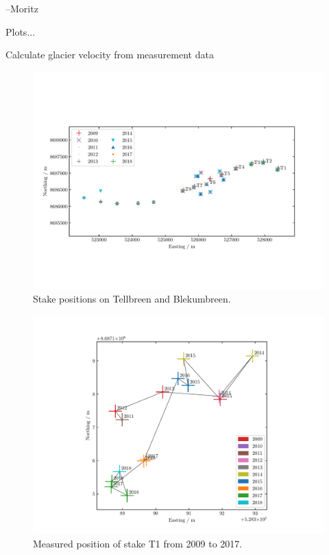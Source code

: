 --Moritz


Plots...

Calculate glacier velocity from measurement data

\begin{figure}[H]
    \centering
    \includegraphics[width=\textwidth]{../fig/stakePositions.pdf}
    \caption{Stake positions on Tellbreen and Blekumbreen.}
    \label{GF:fig:stakepos}
\end{figure}



\begin{figure}[H]
    \centering
    \includegraphics[width=\textwidth]{../fig/T1_2d.pdf}
    \caption{Measured position of stake T1 from 2009 to 2017.}
    \label{GF:fig:T1_2d}
\end{figure}
